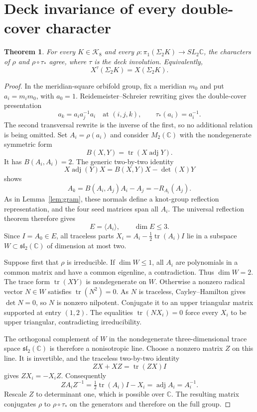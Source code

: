 \documentclass[11pt]{article}
\newtheorem{theorem}{Theorem}
\newcommand{\tr}{\operatorname{tr}}
\newcommand{\adj}{\operatorname{adj}}
\newcommand{\C}{\mathbb C}
\begin{document}
\section{Deck invariance of every double-cover character}

\begin{theorem}\label{thm:deck}
For every $K\in\mathcal K_8$ and every
$\rho:\pi_1(\Sigma_2K)\to SL_2\C$, the characters of $\rho$ and
$\rho\circ\tau_*$ agree, where $\tau$ is the deck involution.
Equivalently,
\[
                          X^\tau(\Sigma_2K)=X(\Sigma_2K).
\]
\end{theorem}
\begin{proof}
In the meridian-square orbifold group, fix a meridian $m_0$ and put
$a_i=m_i m_0$, with $a_0=1$. Reidemeister--Schreier rewriting gives
the double-cover presentation
\[
                 a_k=a_i a_j^{-1}a_i\quad\text{at }(i,j,k),
                  \qquad \tau_*(a_i)=a_i^{-1}.
\]
The second transversal rewrite is the inverse of the first, so no
additional relation is being omitted. Set $A_i=\rho(a_i)$ and
consider $M_2(\C)$ with the nondegenerate symmetric form
\[
                          B(X,Y)=\tr(X\adj Y).
\]
It has $B(A_i,A_i)=2$. The generic two-by-two identity
\begin{equation}\label{eq:adj}
 X\adj(Y)X=B(X,Y)X-\det(X)Y
\end{equation}
shows
\[
                   A_k=B(A_i,A_j)A_i-A_j=-R_{A_i}(A_j).
\]
As in Lemma~\ref{lem:gram}, these normals define a knot-group
reflection representation, and the four seed matrices span all
$A_i$. The universal reflection theorem therefore gives
\[
                         E=\langle A_i\rangle,\qquad\dim E\le3.
\]
Since $I=A_0\in E$, all traceless parts
$X_i=A_i-\frac12\tr(A_i)I$ lie in a subspace
$W\subset\mathfrak{sl}_2(\C)$ of dimension at most two.

Suppose first that $\rho$ is irreducible. If $\dim W\le1$, all
$A_i$ are polynomials in a common matrix and have a common eigenline,
a contradiction. Thus $\dim W=2$.
The trace form $\tr(XY)$ is nondegenerate on $W$. Otherwise a nonzero
radical vector $N\in W$ satisfies $\tr(N^2)=0$. As $N$ is traceless,
Cayley--Hamilton gives $\det N=0$, so $N$ is nonzero nilpotent.
Conjugate it to an upper triangular matrix supported at entry $(1,2)$.
The equalities $\tr(NX_i)=0$ force every $X_i$ to be upper triangular,
contradicting irreducibility.

The orthogonal complement of $W$ in the nondegenerate
three-dimensional trace space $\mathfrak{sl}_2(\C)$ is therefore a
nonisotropic line. Choose a nonzero matrix $Z$ on this line. It is
invertible, and the traceless two-by-two identity
\[
                         ZX+XZ=\tr(ZX)I
\]
gives $ZX_i=-X_iZ$. Consequently
\[
                 ZA_iZ^{-1}=\tfrac12\tr(A_i)I-X_i
                              =\adj A_i=A_i^{-1}.
\]
Rescale $Z$ to determinant one, which is possible over $\C$.
The resulting matrix conjugates $\rho$ to $\rho\circ\tau_*$ on the
generators and therefore on the full group.


\end{proof}
\end{document}
